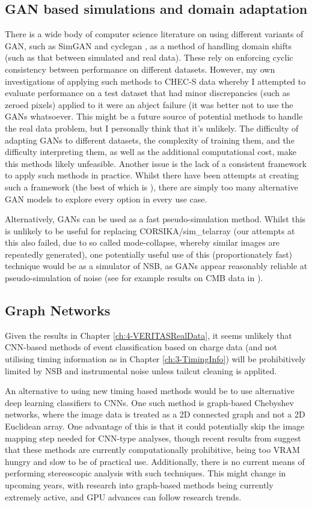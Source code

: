 \subsection{GAN based simulations and domain adaptation}
There is a wide body of computer science literature on using different variants of GAN, such as SimGAN \cite{simgan} and cyclegan \cite{cyclegan}, as a method of handling domain shifts (such as that between simulated and real data). These rely on enforcing cyclic consistency between performance on different datasets. However, my own investigations of applying such methods to CHEC-S data whereby I attempted to evaluate performance on a test dataset that had minor discrepancies (such as zeroed pixels) applied to it were an abject failure (it was better not to use the GANs whatsoever. This might be a future source of potential methods to handle the real data problem, but I personally think that it's unlikely. The difficulty of adapting GANs to different datasets, the complexity of training them, and the difficulty interpreting them, as well as the additional computational cost, make this methods likely unfeasible. Another issue is the lack of a consistent framework to apply such methods in practice. Whilst there have been attempts at creating such a framework (the best of which is \cite{kerasgan}), there are simply too many alternative GAN models to explore every option in every use case. 

Alternatively, GANs can be used as a fast pseudo-simulation method. Whilst this is unlikely to be useful for replacing CORSIKA/sim\_telarray (our attempts at this also failed, due to so called mode-collapse, whereby similar images are repeatedly generated), one potentially useful use of this (proportionately fast) technique would be as a simulator of NSB, as GANs appear reasonably reliable at pseudo-simulation of noise (see for example results on CMB data in \cite{darshgan}). 

\subsection{Graph Networks}
Given the results in Chapter \ref{ch:4-VERITASRealData}, it seems unlikely that CNN-based methods of event classification based on charge data (and not utilising timing information as in Chapter \ref{ch:3-TimingInfo}) will be prohibitively limited by NSB and instrumental noise unless tailcut cleaning is applited.

An alternative to using new timing based methods would be to use alternative deep learning classifiers to CNNs. One such method is graph-based Chebyshev networks, where the image data is treated as a 2D connected graph and not a 2D Euclidean array. One advantage of this is that it could potentially skip the image mapping step needed for CNN-type analyses, though recent results from \cite{adithesis} suggest that these methods are currently computationally prohibitive, being too VRAM hungry and slow to be of practical use. Additionally, there is no current means of performing stereoscopic analysis with such techniques. This might change in upcoming years, with research into graph-based methods being currently extremely active, and GPU advances can follow research trends.

